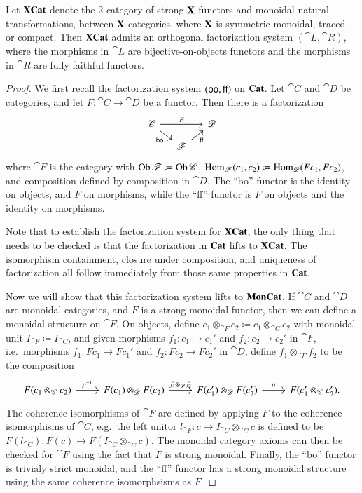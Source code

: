 \documentclass[12pt,oneside,article,draft]{memoir}
\begin{document}

\begin{lemma}\label{lemma:factorization system}
	Let $\mathbf{XCat}$ denote the 2-category of strong $\mathbf{X}$-functors and monoidal natural transformations, between $\mathbf{X}$-categories, where $\mathbf{X}$ is symmetric monoidal, traced, or compact.
	Then $\mathbf{XCat}$ admits an orthogonal factorization system $(\cat{L},\cat{R})$, where the morphisms in $\cat{L}$ are bijective-on-objects functors and the morphisms in $\cat{R}$ are fully faithful functors.
\end{lemma}
\begin{proof}
	We first recall the factorization system $(\mathsf{bo},\mathsf{ff})$ on $\mathbf{Cat}$.
	Let $\cat{C}$ and $\cat{D}$ be categories, and let $F\colon\cat{C}\to\cat{D}$ be a functor.
	Then there is a factorization
	\[
	\begin{tikzcd}[column sep=small, row sep=small]
		\cat{C} \ar[rr, "F"] \ar[dr, "\bo"'] && \cat{D} \\
		& \cat{F} \ar[ur, "\ff"']
	\end{tikzcd}
	\]
	where $\cat{F}$ is the category with $\operatorname{Ob}\mathscr{F}\coloneqq \operatorname{Ob}\mathscr{C}$, $\operatorname{Hom}_{\mathscr{F}}(c_1,c_2)\coloneqq\operatorname{Hom}_{\mathscr{D}}(Fc_1,Fc_2)$, and composition defined by composition in $\cat{D}$.
	The ``bo'' functor is the identity on objects, and $F$ on morphisms, while the ``ff'' functor is $F$ on objects and the identity on morphisms.

	Note that to establish the factorization system for $\mathbf{XCat}$, the only thing that needs to be checked is that the factorization in $\mathbf{Cat}$ lifts to $\mathbf{XCat}$.
	The isomorphism containment, closure under composition, and uniqueness of factorization all follow immediately from those same properties in $\mathbf{Cat}$.

	Now we will show that this factorization system lifts to $\mathbf{MonCat}$.
	If $\cat{C}$ and $\cat{D}$ are monoidal categories, and $F$ is a strong monoidal functor, then we can define a monoidal structure on $\cat{F}$.
	On objects, define $c_1\otimes_{\cat{F}}c_2\coloneqq c_1\otimes_{\cat{C}}c_2$ with monoidal unit $I_{\cat{F}}\coloneqq I_{\cat{C}}$, and given morphisms $f_1\colon c_1\to c_1'$ and $f_2\colon c_2\to c_2'$ in $\cat{F}$, i.e.~morphisms $f_1\colon Fc_1\to Fc_1'$ and $f_2\colon Fc_2\to Fc_2'$ in $\cat{D}$, define $f_1\otimes_{\cat{F}}f_2$ to be the composition
	\[
	\begin{tikzcd}
		F(c_1\otimes_{\cat{C}}c_2) \ar[r,"\mu^{-1}"] & F(c_1)\otimes_{\cat{D}}F(c_2) \ar[r,"f_1\otimes_{\cat{D}}f_2"] & F(c_1')\otimes_{\cat{D}}F(c_2') \ar[r,"\mu"] & F(c_1'\otimes_{\cat{C}}c_2').
	\end{tikzcd}
	\]
	The coherence isomorphisms of $\cat{F}$ are defined by applying $F$ to the coherence isomorphisms of $\cat{C}$, e.g.~the left unitor $l_{\cat{F}}\colon c\to I_{\cat{C}}\otimes_{\cat{C}}c$ is defined to be $F(l_{\cat{C}})\colon F(c)\to F(I_{\cat{C}}\otimes_{\cat{C}}c)$.
	The monoidal category axioms can then be checked for $\cat{F}$ using the fact that $F$ is strong monoidal.
	Finally, the ``bo'' functor is trivialy strict monoidal, and the ``ff'' functor has a strong monoidal structure using the same coherence isomorphsisms as $F$.


\end{proof}
\end{document}
